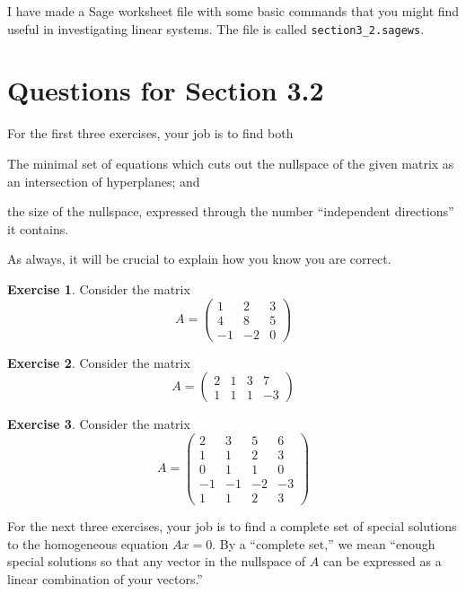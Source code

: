 \documentclass[11pt]{amsart}
\theoremstyle{definition}
\newtheorem{exercise}{Exercise}
\begin{document}
I have made a Sage worksheet file with some basic commands that you might find useful in investigating linear systems. The file is called \texttt{section3\_2.sagews}.


\section{Questions for Section 3.2}
\setcounter{exercise}{83}

For the first three exercises, your job is to find both
\begin{compactitem}
\item The minimal set of equations which cuts out the nullspace of the given matrix as an intersection of hyperplanes; and

\item the size of the nullspace, expressed through the number ``independent directions'' it contains.
\end{compactitem}
As always, it will be crucial to explain how you know you are correct.

\begin{exercise}
Consider the matrix
\[
A = \begin{pmatrix}
1 & 2 & 3 \\
4 & 8 & 5 \\
-1 & -2 & 0
\end{pmatrix}
\]
\end{exercise}

\begin{exercise}
Consider the matrix
\[
A = \begin{pmatrix}
2 & 1 & 3 & 7 \\
1 & 1 & 1 & -3
\end{pmatrix}
\]
\end{exercise}

\begin{exercise}
Consider the matrix
\[
A = \begin{pmatrix}
2 & 3 & 5 & 6 \\
1 & 1 & 2 & 3 \\
0 & 1 & 1 & 0 \\
-1 & -1 & -2 & -3 \\
1 & 1 & 2 & 3
\end{pmatrix}
\]
\end{exercise}

For the next three exercises, your job is to find a complete set of special solutions to the homogeneous equation $Ax=0$. By a ``complete set,'' we mean ``enough special solutions so that any vector in the nullspace of $A$ can be expressed as a linear combination of your vectors.''
\end{document}
